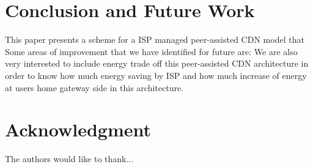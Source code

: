 \documentclass[conference]{IEEEtran}
\begin{document}
\section{Conclusion and Future Work}\label{conclusion}
This paper presents a scheme for a ISP managed peer-assisted CDN model that 
Some areas of improvement that we have identified for future are:
We are also very interested to include energy trade off this peer-assisted CDN architecture in order to know how much energy saving by ISP and how much increase of energy at users home gateway side in this architecture.











\section*{Acknowledgment}

The authors would like to thank...







%
%
%





\end{document}
